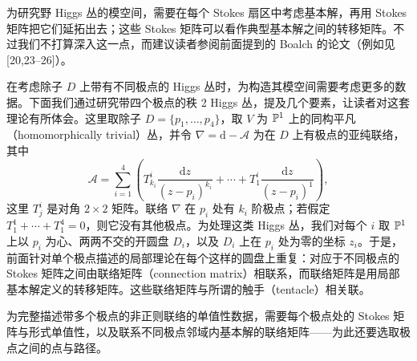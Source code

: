 为研究野 Higgs 丛的模空间，需要在每个 Stokes 扇区中考虑基本解，再用 Stokes 矩阵把它们延拓出去；这些 Stokes 矩阵可以看作典型基本解之间的转移矩阵。不过我们不打算深入这一点，而建议读者参阅前面提到的 Boalch 的论文（例如见 [20,23--26]）。

在考虑除子 $D$ 上带有不同极点的 Higgs 丛时，为构造其模空间需要考虑更多的数据。下面我们通过研究带四个极点的秩 2 Higgs 丛，提及几个要素，让读者对这套理论有所体会。这里取除子 $D=\{p_1,\dots,p_4\}$，取 $V$ 为 $\mathbb{P}^{1}$ 上的同构平凡（homomorphically trivial）丛，并令 $\nabla=\mathrm{d}-\mathcal{A}$ 为在 $D$ 上有极点的亚纯联络，其中
\[
\mathcal{A}=\sum_{i=1}^{4}\left(T^{i}_{k_i}\frac{\mathrm{d}z}{(z-p_i)^{k_i}}+\cdots+T^{i}_{1}\frac{\mathrm{d}z}{(z-p_i)^{1}}\right),
\]
这里 $T^{i}_{j}$ 是对角 $2\times2$ 矩阵。联络 $\nabla$ 在 $p_i$ 处有 $k_i$ 阶极点；若假定 $T^{1}_{1}+\cdots+T^{4}_{1}=0$，则它没有其他极点。为处理这类 Higgs 丛，我们对每个 $i$ 取 $\mathbb{P}^{1}$ 上以 $p_i$ 为心、两两不交的开圆盘 $D_i$，以及 $D_i$ 上在 $p_i$ 处为零的坐标 $z_i$。于是，前面针对单个极点描述的局部理论在每个这样的圆盘上重复：对应于不同极点的 Stokes 矩阵之间由联络矩阵（connection matrix）相联系，而联络矩阵是用局部基本解定义的转移矩阵。这些联络矩阵与所谓的触手（tentacle）相关联。


为完整描述带多个极点的非正则联络的单值性数据，需要每个极点处的 Stokes 矩阵与形式单值性，以及联系不同极点邻域内基本解的联络矩阵——为此还要选取极点之间的点与路径。
